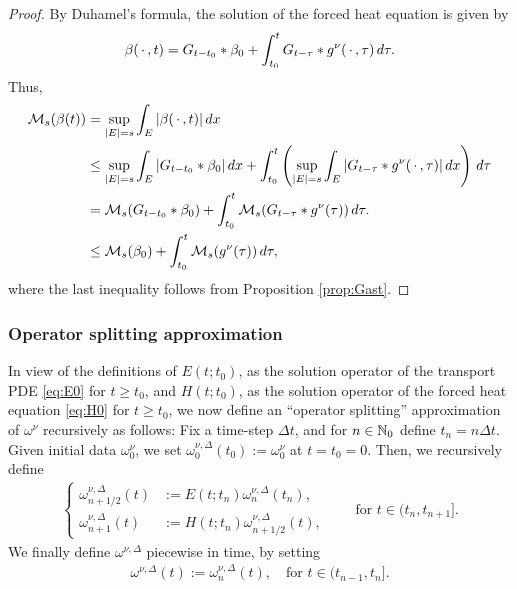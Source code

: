 \documentclass[reqno,12pt]{amsart}
\begin{document}
\begin{proof}
  By Duhamel's formula, the solution of the forced heat equation is given by
  \[
  \beta({\,\cdot\,}, t) = G_{t-t_0} \ast \beta_0 + \int_{t_0}^{t} G_{t-\tau} \ast g^\nu({\,\cdot\,}, \tau) \, d\tau.
  \]
  Thus,
  \begin{align*}
  \mathcal{M}_s (\beta(t))
  &=
  \sup_{|E|=s} \int_E |\beta({\,\cdot\,}, t)| \, dx
  \\
  &\le
  \sup_{|E|=s} \int_E |G_{t-t_0} \ast \beta_0| \, dx
  +
  \int_{t_0}^t \left( \sup_{|E|=s} \int_E |G_{t-\tau} \ast g^\nu({\,\cdot\,},\tau)| \, dx \right) \, d\tau
  \\
  &=
  \mathcal{M}_s(G_{t-t_0} \ast \beta_0)
  +
  \int_{t_0}^t \mathcal{M}_s (G_{t-\tau}\ast g^\nu(\tau)) \, d\tau.
  \\
  &\le
  \mathcal{M}_s (\beta_0)
  +
  \int_{t_0}^t \mathcal{M}_s (g^\nu(\tau)) \, d\tau,
  \end{align*}
 where the last inequality follows from Proposition \ref{prop:Gast}.
\end{proof}

\subsubsection{Operator splitting approximation}
\label{sec:split-approx}

In view of the definitions of $E(t;t_0)$, as the solution operator of the transport PDE \eqref{eq:E0} for $t\ge t_0$, and $H(t;t_0)$, as the solution operator of the forced heat equation \eqref{eq:H0} for $t\ge t_0$, we now define an ``operator splitting'' approximation of $\omega^\nu$ recursively as follows: Fix a time-step $\Delta t$, and for $n\in \mathbb{N}_0$ define $t_n = n \Delta t$. Given initial data $\omega^\nu_0$, we set $\omega^{\nu,\Delta}_0(t_0) := \omega^\nu_0$ at $t=t_0=0$. Then, we recursively define
\begin{align}
  \label{eq:osplit}
  \left\{
  \begin{aligned}
  \omega^{\nu,\Delta}_{n+1/2}(t) &:= E(t;t_{n}) \omega^{\nu,\Delta}_{n}(t_{n}), \\
  \omega^{\nu,\Delta}_{n+1}(t) &:= H(t;t_{n}) \omega^{\nu,\Delta}_{n+1/2}(t),
  \end{aligned}
  \right.
  \qquad  \text{for }t \in (t_{n},t_{n+1}].
\end{align}
We finally define $\omega^{\nu,\Delta}$ piecewise in time, by setting
\begin{align}
\label{eq:osplit-all}
\omega^{\nu,\Delta}(t) := \omega^{\nu,\Delta}_n(t), \quad \text{for }
t\in (t_{n-1},t_n].
\end{align}
\end{document}
